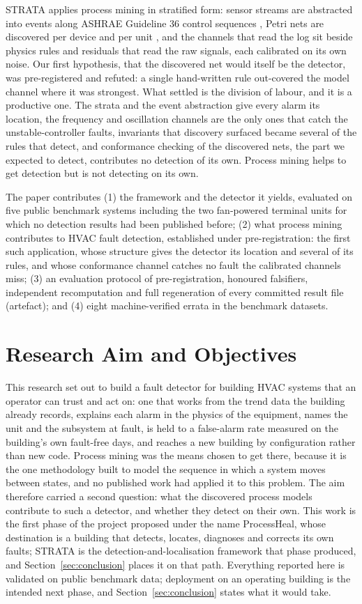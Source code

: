 \documentclass[11pt,letterpaper]{article}
\begin{document}
STRATA applies process mining in stratified form: sensor streams are abstracted into events along ASHRAE Guideline 36 control sequences \cite{ashrae2021guideline36}, Petri nets are discovered per device and per unit \cite{vanderaalst2016processmining}, and the channels that read the log sit beside physics rules and residuals that read the raw signals, each calibrated on its own noise. Our first hypothesis, that the discovered net would itself be the detector, was pre-registered and refuted: a single hand-written rule out-covered the model channel where it was strongest. What settled is the division of labour, and it is a productive one. The strata and the event abstraction give every alarm its location, the frequency and oscillation channels are the only ones that catch the unstable-controller faults, invariants that discovery surfaced became several of the rules that detect, and conformance checking of the discovered nets, the part we expected to detect, contributes no detection of its own. Process mining helps to get detection but is not detecting on its own.

The paper contributes (1) the framework and the detector it yields, evaluated on five public benchmark systems including the two fan-powered terminal units for which no detection results had been published before; (2) what process mining contributes to HVAC fault detection, established under pre-registration: the first such application, whose structure gives the detector its location and several of its rules, and whose conformance channel catches no fault the calibrated channels miss; (3) an evaluation protocol of pre-registration, honoured falsifiers, independent recomputation and full regeneration of every committed result file (artefact); and (4) eight machine-verified errata in the benchmark datasets.

\section{Research Aim and Objectives}
\label{sec:aims}
This research set out to build a fault detector for building HVAC systems that an operator can trust and act on: one that works from the trend data the building already records, explains each alarm in the physics of the equipment, names the unit and the subsystem at fault, is held to a false-alarm rate measured on the building's own fault-free days, and reaches a new building by configuration rather than new code. Process mining was the means chosen to get there, because it is the one methodology built to model the sequence in which a system moves between states, and no published work had applied it to this problem. The aim therefore carried a second question: what the discovered process models contribute to such a detector, and whether they detect on their own. This work is the first phase of the project proposed under the name ProcessHeal, whose destination is a building that detects, locates, diagnoses and corrects its own faults; STRATA is the detection-and-localisation framework that phase produced, and Section~\ref{sec:conclusion} places it on that path. Everything reported here is validated on public benchmark data; deployment on an operating building is the intended next phase, and Section~\ref{sec:conclusion} states what it would take.
\end{document}
